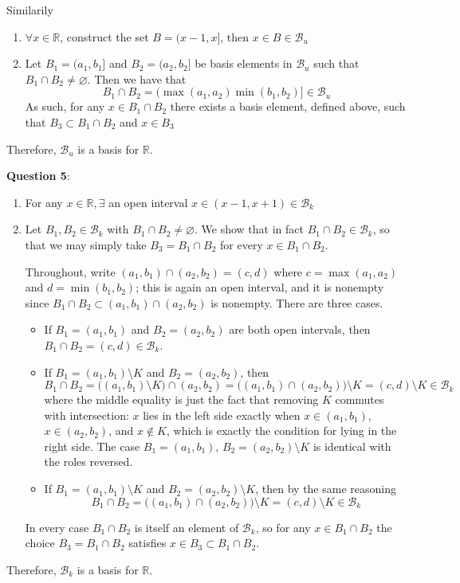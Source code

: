 \documentclass{article} %
\newcommand{\question}[2][]{
  \begin{flushleft}
    \textbf{Question #1}: \textit{#2}

\end{flushleft}}
\begin{document}
Similarily
\begin{enumerate}
  \item $\forall x \in \mathbb{R}$, construct the set $B = (x - 1,
    x]$, then $x \in B \in \mathcal{B}_u$
  \item Let $B_1 = (a_1 , b_1]$ and $B_2 = (a_2, b_2]$ be basis
    elements in $\mathcal{B}_u$ such that $B_1 \cap B_2 \neq
    \varnothing$. Then we have that
    \[
      B_1 \cap B_2 = (\max(a_1, a_2) \min(b_1, b_2)] \in \mathcal{B}_u
    \]
    As such, for any $x \in B_1 \cap B_2$ there exists a basis
    element, defined above, such that $B_3 \subset B_1 \cap B_2$ and $x \in B_3$
\end{enumerate}
Therefore, $\mathcal{B}_u$ is a basis for $\mathbb{R}$.

\question[5]{}
\begin{enumerate}
  \item For any $x \in \mathbb{R}, \exists$ an open interval $x \in (x-1,
    x+1) \in \mathcal{B}_k$
  \item Let $B_1, B_2 \in \mathcal{B}_k$ with $B_1 \cap B_2 \neq
    \varnothing$. We show that in fact $B_1 \cap B_2 \in
    \mathcal{B}_k$, so that we may simply take $B_3 = B_1 \cap B_2$
    for every $x \in B_1 \cap B_2$.

    Throughout, write $(a_1, b_1) \cap (a_2, b_2) = (c,d)$ where $c =
    \max(a_1,a_2)$ and $d = \min(b_1,b_2)$; this is again an open
    interval, and it is nonempty since $B_1 \cap B_2 \subset (a_1,b_1)
    \cap (a_2,b_2)$ is nonempty. There are three cases.
    \begin{itemize}
      \item If $B_1 = (a_1,b_1)$ and $B_2 = (a_2,b_2)$ are both open
        intervals, then $B_1 \cap B_2 = (c,d) \in \mathcal{B}_k$.
      \item If $B_1 = (a_1,b_1) \setminus K$ and $B_2 = (a_2,b_2)$,
        then
        \[
          B_1 \cap B_2 = \big((a_1,b_1) \setminus K\big) \cap (a_2,b_2)
          = \big((a_1,b_1) \cap (a_2,b_2)\big) \setminus K = (c,d)
          \setminus K \in \mathcal{B}_k
        \]
        where the middle equality is just the fact that removing $K$
        commutes with intersection: $x$ lies in the left side exactly
        when $x \in (a_1,b_1)$, $x \in (a_2,b_2)$, and $x \notin K$,
        which is exactly the condition for lying in the right side.
        The case $B_1 = (a_1,b_1)$, $B_2 = (a_2,b_2) \setminus K$ is
        identical with the roles reversed.
      \item If $B_1 = (a_1,b_1) \setminus K$ and $B_2 = (a_2,b_2)
        \setminus K$, then by the same reasoning
        \[
          B_1 \cap B_2 = \big((a_1,b_1) \cap (a_2,b_2)\big) \setminus
          K = (c,d) \setminus K \in \mathcal{B}_k
        \]
    \end{itemize}
    In every case $B_1 \cap B_2$ is itself an element of
    $\mathcal{B}_k$, so for any $x \in B_1 \cap B_2$ the choice $B_3 =
    B_1 \cap B_2$ satisfies $x \in B_3 \subset B_1 \cap B_2$.
\end{enumerate}
Therefore, $\mathcal{B}_k$ is a basis for $\mathbb{R}$.
\end{document}
